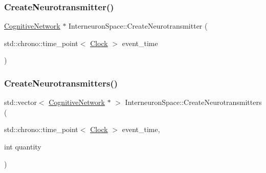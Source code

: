 \mbox{\label{classInterneuronSpace_a26d98a0ae78ce363ab93e92cf0c973e7}} 
\subsubsection{\texorpdfstring{Create\+Neurotransmitter()}{CreateNeurotransmitter()}}
{\footnotesize\ttfamily \mbox{\hyperlink{classCognitiveNetwork}{Cognitive\+Network}} $\ast$ Interneuron\+Space\+::\+Create\+Neurotransmitter (\begin{DoxyParamCaption}\item[{std\+::chrono\+::time\+\_\+point$<$ \mbox{\hyperlink{universe_8h_a0ef8d951d1ca5ab3cfaf7ab4c7a6fd80}{Clock}} $>$}]{event\+\_\+time }\end{DoxyParamCaption})}

\mbox{\label{classInterneuronSpace_af69f7190226d77a30a80d66d7c28e0ba}} 
\subsubsection{\texorpdfstring{Create\+Neurotransmitters()}{CreateNeurotransmitters()}}
{\footnotesize\ttfamily std\+::vector$<$ \mbox{\hyperlink{classCognitiveNetwork}{Cognitive\+Network}} $\ast$ $>$ Interneuron\+Space\+::\+Create\+Neurotransmitters (\begin{DoxyParamCaption}\item[{std\+::chrono\+::time\+\_\+point$<$ \mbox{\hyperlink{universe_8h_a0ef8d951d1ca5ab3cfaf7ab4c7a6fd80}{Clock}} $>$}]{event\+\_\+time,  }\item[{int}]{quantity }\end{DoxyParamCaption})}

\mbox{\label{classInterneuronSpace_a41eb332165b0a67c3549bd73a8faa969}} 
